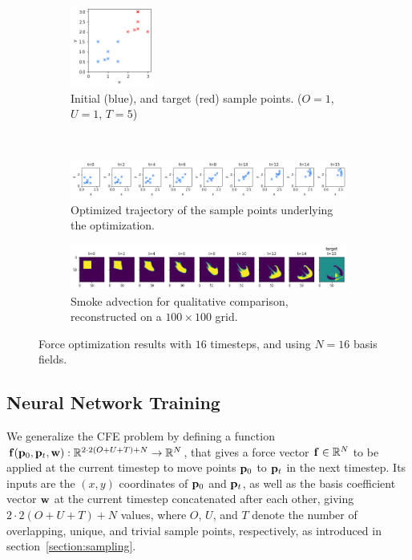 \begin{figure}
  \centering
  \begin{subfigure}{\textwidth}
    \centering
    \includegraphics[width=0.3\textwidth]{figures/f-optim/blue_start_red_target.png}
    \caption{Initial (blue), and target (red) sample points. ($O=1$, $U=1$,
    $T=5$)}
  \end{subfigure}\\
  \begin{subfigure}{\textwidth}
    \centering
    \includegraphics[width=\textwidth]{figures/f-optim/trajectory_horizontal.png}
    \caption{Optimized trajectory of the sample points underlying the
    optimization.}
  \end{subfigure}\par\medskip
  \begin{subfigure}{\textwidth}
    \centering
    \includegraphics[width=\textwidth]{figures/f-optim/smoke_trajectory_horizontal.png}
    \caption{Smoke advection for qualitative comparison, reconstructed on
    a $100\times 100$ grid.}
  \end{subfigure}\par\medskip
  \caption{Force optimization results with $16$ timesteps, and using $N=16$
  basis fields.}
  \label{fig:f_optim}
\end{figure}

\pagebreak
\subsection{Neural Network Training}\label{section:nn-training}
We generalize the \acf{CFE} problem by defining a function
$\vb{f}(\vb{p}_0,\vb{p}_t,\vb{w}): \mathbb{R}^{2\cdot2(O+U+T)+N}\to
\mathbb{R}^N$, that gives a force vector $\vb{f} \in \mathbb{R}^N$ to be
applied at the current timestep to move points $\vb{p}_0$ to $\vb{p}_t$ in the
next timestep. Its inputs are the $(x,y)$ coordinates of $\vb{p}_0$ and
$\vb{p}_t$, as well as the basis coefficient vector $\vb{w}$ at the current
timestep concatenated after each other, giving $2\cdot2(O+U+T)+N$ values, where
$O$, $U$, and $T$ denote the number of overlapping, unique, and trivial sample
points, respectively, as introduced in section~\ref{section:sampling}.

